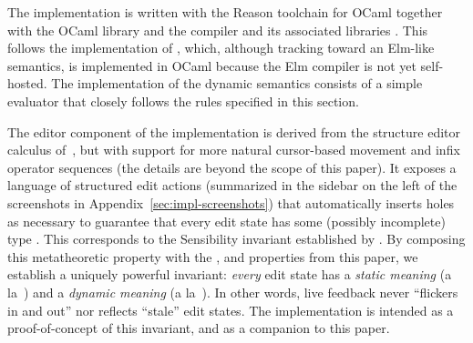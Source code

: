 %
%

The implementation is written with the Reason toolchain for OCaml \cite{reason-what,leroy03:_ocaml}
together with the OCaml  library \cite{OcamlReact}
and the  compiler and its associated libraries \cite{vouillon2014bytecode}. This follows the implementation of \Hazel, which, although tracking toward an Elm-like semantics, is implemented in OCaml because the Elm compiler is not yet self-hosted. The implementation of the dynamic semantics consists of a simple evaluator that closely follows the rules specified in this section.

The editor component of the implementation is derived
from the structure editor calculus of~\Hazelnut, but with support for more natural cursor-based movement and infix operator sequences (the details are beyond the scope of this paper). It exposes a language of structured
edit actions (summarized in the sidebar on the left of
the screenshots in Appendix~\ref{sec:impl-screenshots}) that automatically inserts holes as necessary
to guarantee that every edit state has some (possibly incomplete) type
. This corresponds to the Sensibility invariant established by \citet{popl-paper}.
By composing this metatheoretic property with
the , 
and  properties from this paper, we establish a
uniquely powerful invariant: \emph{every} edit state has a \emph{static
meaning} (a la~\Hazelnut) and a \emph{dynamic meaning} (a la~\HazelnutLive).
%
In other words, live feedback never ``flickers in and out'' nor reflects ``stale'' edit states.
%
The implementation is intended as a proof-of-concept of this invariant, and as a companion to this paper.



